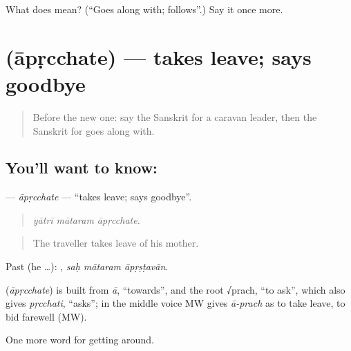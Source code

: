 \begin{tcolorbox}[breakable,colback=teal!4,colframe=teal!35!black,title={Before you move on}]
What does  mean? (\textquotedblleft{}Goes along with; follows\textquotedblright{}.) Say it once more.
\end{tcolorbox}
\section[\texorpdfstring{\sk{आपृच्छते} (āpṛcchate)}{आपृच्छते (āpṛcchate)}]{ (āpṛcchate) — takes leave; says goodbye}

\label{lesson:SA-C395-aprcchate}



\begin{quote}
Before the new one: say the Sanskrit for a caravan leader, then the Sanskrit for goes along with.
\end{quote}

\subsection*{You'll want to know: }
\textbf{} — \emph{āpṛcchate} — \textquotedblleft{}takes leave; says goodbye\textquotedblright{}.

\begin{quote}
  
\end{quote}

\begin{quote}
\emph{yātrī mātaram āpṛcchate.}
\end{quote}

\begin{quote}
The traveller takes leave of his mother.
\end{quote}

Past (he …):   , \emph{saḥ mātaram āpṛṣṭavān}.

\begin{cousinweb}
\textbf{} (\emph{āpṛcchate}) is built from \emph{ā}, \textquotedblleft{}towards\textquotedblright{}, and the root √prach, \textquotedblleft{}to ask\textquotedblright{}, which also gives \emph{pṛcchati}, \textquotedblleft{}asks\textquotedblright{}; in the middle voice MW gives \emph{ā-prach} as to take leave, to bid farewell (MW).
\end{cousinweb}

\begin{grammarlens}[title={What you've built}]
One more word for getting around.
\end{grammarlens}

